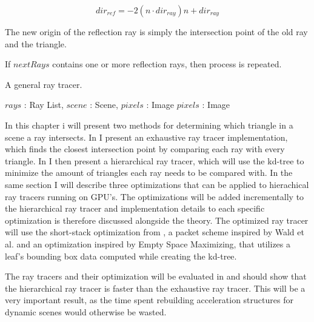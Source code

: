 \begin{displaymath}
  dir_{ref} = -2 (n \cdot dir_{ray}) n + dir_{ray}
\end{displaymath}

The new origin of the reflection ray is simply the intersection point of the old
ray and the triangle.

If $nextRays$ contains one or more reflection rays, then process is repeated.

\begin{algorithm}
  \caption{A general ray tracer.}
  \label{alg:generalRayTracer}
  \begin{algorithmic}
              {$rays$ : Ray List, $scene$ : Scene, $pixels$ : Image}
              {$pixels$ : Image}{
                  \ENDIF
                \ENDFOR
                \ENDIF
              }
  \end{algorithmic}
\end{algorithm}

In this chapter i will present two methods for determining which triangle in a
scene a ray intersects. In  I present an exhaustive
ray tracer implementation, which finds the closest intersection point by
comparing each ray with every triangle. In
 I then present a hierarchical ray tracer,
which will use the kd-tree to minimize the amount of triangles each ray needs to
be compared with. In the same section I will describe three optimizations that
can be applied to hierachical ray tracers running on GPU's. The optimizations
will be added incrementally to the hierarchical ray tracer and implementation
details to each specific optimization is therefore discussed alongside the
theory. The optimized ray tracer will use the short-stack optimization from
\horn, a packet scheme inspired by Wald et al. and an
optimization inspired by Empty Space Maximizing, that utilizes a leaf's bounding
box data computed while creating the kd-tree.

The ray tracers and their optimization will be evaluated in
 and should show that the hierarchical ray tracer is
faster than the exhaustive ray tracer. This will be a very important result, as
the time spent rebuilding acceleration structures for dynamic scenes would
otherwise be wasted.

